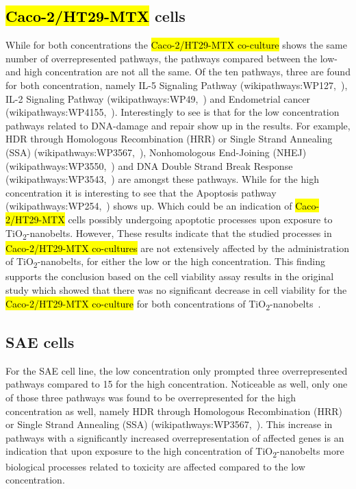 \documentclass[ijms,article,submit,moreauthors,pdftex]{Definitions/mdpi}
\begin{document}
\subsection*{\hl{Caco-2/HT29-MTX} cells}
While for both concentrations the \hl{Caco-2/HT29-MTX co-culture} shows the same number of overrepresented pathways, the pathways compared between the low- and high concentration are not all the same. Of the ten pathways, three are found for both concentration, namely IL-5 Signaling Pathway (wikipathways:WP127,~\cite{WP127}), IL-2 Signaling Pathway (wikipathways:WP49,~\cite{WP49}) and Endometrial cancer (wikipathways:WP4155,~\cite{WP4155}). Interestingly to see is that for the low concentration pathways related to DNA-damage and repair show up in the results. For example, HDR through Homologous Recombination (HRR) or Single Strand Annealing (SSA) (wikipathways:WP3567,~\cite{WP3567}), Nonhomologous End-Joining (NHEJ) (wikipathways:WP3550,~\cite{WP3550}) and DNA Double Strand Break Response (wikipathways:WP3543,~\cite{WP3543}) are amongst these pathways. While for the high concentration it is interesting to see that the Apoptosis pathway (wikipathways:WP254,~\cite{WP254}) shows up. Which could be an indication of \hl{Caco-2/HT29-MTX} cells possibly undergoing apoptotic processes upon exposure to TiO\textsubscript{2}-nanobelts. However, These results indicate that the studied processes in \hl{Caco-2/HT29-MTX co-cultures} are not extensively affected by the administration of TiO\textsubscript{2}-nanobelts, for either the low or the high concentration. This finding supports the conclusion based on the cell viability assay results in the original study which showed that there was no significant decrease in cell viability for the \hl{Caco-2/HT29-MTX co-culture} for both concentrations of TiO\textsubscript{2}-nanobelts~\cite{Tilton2013}. 

\subsection*{SAE cells}
For the SAE cell line, the low concentration only prompted three overrepresented pathways compared to 15 for the high concentration. Noticeable as well, only one of those three pathways was found to be overrepresented for the high concentration as well, namely HDR through Homologous Recombination (HRR) or Single Strand Annealing (SSA) (wikipathways:WP3567,~\cite{WP3567}). This increase in pathways with a significantly increased overrepresentation of affected genes is an indication that upon exposure to the high concentration of TiO\textsubscript{2}-nanobelts more biological processes related to toxicity are affected compared to the low concentration. 
\end{document}
